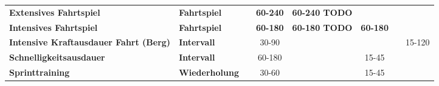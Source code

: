 \begin{table}[]
\begin{tabular}{lllcllll}
\textbf{Extensives Fahrtspiel}                & \textbf{Fahrtspiel}    &                            & \textbf{60-240}                 & \multicolumn{1}{c}{\textbf{60-240 TODO}} &                                     &                            &                            \\
\textbf{Intensives Fahrtspiel}                & \textbf{Fahrtspiel}    &                            & \textbf{60-180}                 & \multicolumn{1}{c}{\textbf{60-180 TODO}} & \multicolumn{1}{c}{\textbf{60-180}} &                            &                            \\
\textbf{Intensive Kraftausdauer Fahrt (Berg)} & \textbf{Intervall}     &                            & 30-90                           &                                          &                                     &                            & \multicolumn{1}{c}{15-120} \\
\textbf{Schnelligkeitsausdauer}               & \textbf{Intervall}     &                            & 60-180                          &                                          & \multicolumn{1}{c}{15-45}           &                            &                            \\
\textbf{Sprinttraining}                       & \textbf{Wiederholung}  &                            & 30-60                           &                                          & \multicolumn{1}{c}{15-45}           &                            &                           
\end{tabular}
\end{table}